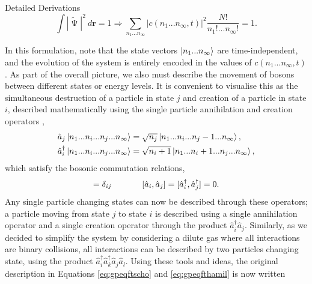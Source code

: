 \begin{chapter}{Detailed Derivations\label{app:App2}}
\begin{equation*}
\int|\tilde{\upPsi}|^2~d\mathbf{r}=1 \Rightarrow \sum_{n_1...n_\infty}|c(n_1...n_\infty,t)|^2\frac{N!}{n_1!...n_\infty!} = 1.
\end{equation*}

In this formulation, note that the state vectors $\ket{n_1...n_\infty}$ are time-independent, and the evolution of the system is entirely encoded in the values of $c(n_1...n_\infty,t)$. As part of the overall picture, we also must describe the movement of bosons between different states or energy levels. It is convenient to visualise this as the simultaneous destruction of a particle in state $j$ and creation of a particle in state $i$, described mathematically using the single particle annihilation and creation operators \cite{schiff1968},
\begin{align*}
&\hat{a}_j\ket{n_1...n_i...n_j...n_\infty} = \sqrt{n_j}\ket{n_1...n_i...n_j-1...n_\infty},\\
&\hat{a}^\dagger_i\ket{n_1...n_i...n_j...n_\infty} = \sqrt{n_i+1}\ket{n_1...n_i+1...n_j...n_\infty},
\end{align*}
which satisfy the bosonic commutation relations,
\begin{equation*}
[\hat{a}_i,\hat{a}_j^\dagger]=\delta_{ij}\hspace{0.5in}[\hat{a}_i,\hat{a}_j]=[\hat{a}_i^\dagger,\hat{a}_j^\dagger]=0.
\end{equation*}
Any single particle changing states can now be described through these operators; a particle moving from state $j$ to state $i$ is described using a single annihilation operator and a single creation operator through the product $\hat{a}_i^\dagger\hat{a}_j$. Similarly, as we decided to simplify the system by considering a dilute gas where all interactions are binary collisions, all interactions can be described by two particles changing state, using the product $\hat{a}_i^\dagger\hat{a}_k^\dagger\hat{a}_j\hat{a}_l$. Using these tools and ideas, the original description in Equations \ref{eq:gpeqftscho} and \ref{eq:gpeqfthamil} is now written


\end{chapter}
